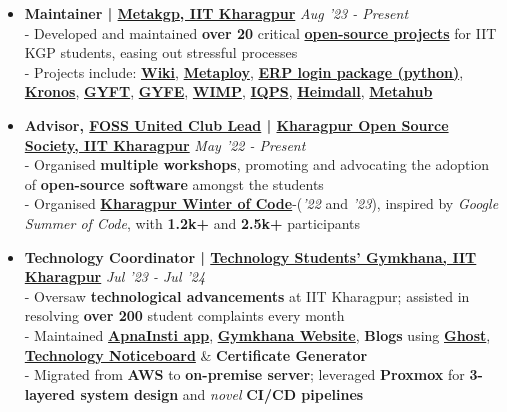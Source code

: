 \documentclass[a4paper,10pt]{extarticle} %
\begin{document}
\begin{itemize}[leftmargin=0.55cm, rightmargin=0.2cm, label={\Large\textbullet}]

\item \textbf{Maintainer | \href{https://metakgp.org/}{Metakgp, IIT Kharagpur}} \hfill{\textit{Aug '23 - Present}}\\
- Developed and maintained \textbf{over 20} critical \textbf{\href{https://github.com/metakgp}{open-source projects}} for IIT KGP students, easing out stressful processes \\
- Projects include: \href{https://wiki.metakgp.org}{\textbf{Wiki}}, \href{https://github.com/metakgp/metaploy}{\textbf{Metaploy}}, \href{https://pypi.org/project/iitkgp-erp-login/}{\textbf{ERP login package (python)}}, \href{http://kronos.streamlit.app}{\textbf{Kronos}}, \href{https://gyft.metakgp.org}{\textbf{GYFT}}, \href{https://gyfe.metakgp.org}{\textbf{GYFE}}, \href{https://github.com/metakgp/wimp}{\textbf{WIMP}}, \href{https://qp.metakgp.org}{\textbf{IQPS}}, \href{https://heimdall.metakgp.org}{\textbf{Heimdall}}, \href{https://github.com/proffapt/Metahub}{\textbf{Metahub}}

\item \textbf{Advisor, \href{https://fossunited.org/clubs}{\textbf{FOSS United Club Lead}} | \href{https://kossiitkgp.org}{Kharagpur Open Source Society, IIT Kharagpur}} \hfill{\textit{May '22 - Present}}\\
- Organised \textbf{multiple workshops}, promoting and advocating the adoption of \textbf{open-source software} amongst the students \\
- Organised \textbf{\href{https://kwoc.kossiitkgp.org/}{Kharagpur Winter of Code}}-(\textit{'22} and \textit{'23}), inspired by \textit{Google Summer of Code}, with \textbf{1.2k+} and \textbf{2.5k+} participants

\item \textbf{Technology Coordinator | \href{https://gymkhana.iitkgp.ac.in/}{Technology Students' Gymkhana, IIT Kharagpur}} \hfill{\textit{Jul '23 - Jul '24}}\\
- Oversaw \textbf{technological advancements} at IIT Kharagpur;  assisted in resolving \textbf{over 200} student complaints every month \\
- Maintained \href{https://play.google.com/store/apps/details?id=com.apnainsti&pli=1}{\textbf{ApnaInsti app}}, \href{https://gymkhana.iitkgp.ac.in/}{\textbf{Gymkhana Website}}, \textbf{Blogs} using \href{https://ghost.org/}{\textbf{Ghost}}, \href{https://github.com/tsg-iitkgp/noticeboard}{\textbf{Technology Noticeboard}} \& \textbf{Certificate Generator} \\
- Migrated from \textbf{AWS} to \textbf{on-premise server}; leveraged \textbf{Proxmox} for \textbf{3-layered system design} and \textit{novel} \textbf{CI/CD pipelines}

\end{itemize}
\end{document}
